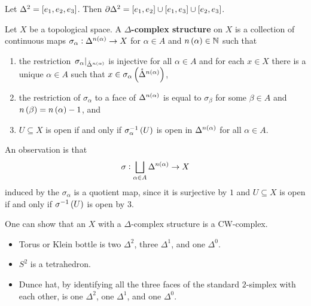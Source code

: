 \begin{example*}
Let $ \Delta^2 = \sbr{e_1, e_2, e_3} $. Then $ \partial\Delta^2 = \sbr{e_1, e_2} \cup \sbr{e_1, e_3} \cup \sbr{e_2, e_3} $.
\end{example*}

\begin{definition*}
Let $ X $ be a topological space. A \textbf{$ \Delta $-complex structure} on $ X $ is a collection of continuous maps $ \sigma_\alpha : \Delta^{n\br{\alpha}} \to X $ for $ \alpha \in A $ and $ n\br{\alpha} \in \N $ such that
\begin{enumerate}
\item the restriction $ \eval{\sigma_\alpha}_{\mathring{\Delta}^{n\br{\alpha}}} $ is injective for all $ \alpha \in A $ and for each $ x \in X $ there is a unique $ \alpha \in A $ such that $ x \in \sigma_\alpha\br{\mathring{\Delta}^{n\br{\alpha}}} $,
\item the restriction of $ \sigma_\alpha $ to a face of $ \Delta^{n\br{\alpha}} $ is equal to $ \sigma_\beta $ for some $ \beta \in A $ and $ n\br{\beta} = n\br{\alpha} - 1 $, and
\item $ U \subseteq X $ is open if and only if $ \sigma_\alpha^{-1}\br{U} $ is open in $ \Delta^{n\br{\alpha}} $ for all $ \alpha \in A $.
\end{enumerate}
\end{definition*}

An observation is that
$$ \sigma : \bigsqcup_{\alpha \in A} \Delta^{n\br{\alpha}} \to X $$
induced by the $ \sigma_\alpha $ is a quotient map, since it is surjective by $ 1 $ and $ U \subseteq X $ is open if and only if $ \sigma^{-1}\br{U} $ is open by $ 3 $.

\begin{remark*}
One can show that an $ X $ with a $ \Delta $-complex structure is a CW-complex.
\end{remark*}

\begin{example*}
\hfill
\begin{itemize}
\item Torus or Klein bottle is two $ \Delta^2 $, three $ \Delta^1 $, and one $ \Delta^0 $.
\item $ S^2 $ is a tetrahedron.
\item Dunce hat, by identifying all the three faces of the standard $ 2 $-simplex with each other, is one $ \Delta^2 $, one $ \Delta^1 $, and one $ \Delta^0 $.
\end{itemize}
\end{example*}


